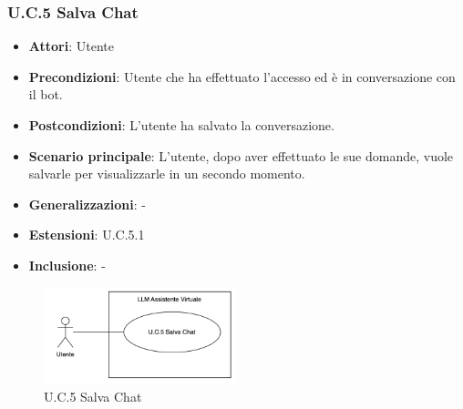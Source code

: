 \subsubsection{U.C.5 Salva Chat}
\begin{itemize}
    \item \textbf{Attori}: Utente
    \item \textbf{Precondizioni}: Utente che ha effettuato l'accesso ed è in conversazione con il bot.
    \item \textbf{Postcondizioni}: L'utente ha salvato la conversazione.
    \item \textbf{Scenario principale}: L'utente, dopo aver effettuato le sue domande, vuole salvarle per visualizzarle in un secondo momento.
    \item \textbf{Generalizzazioni}: -
    \item \textbf{Estensioni}: U.C.5.1
    \item \textbf{Inclusione}: -
\end{itemize}
\begin{figure}[h!]
    \centering
    \includegraphics[width=0.5\textwidth]{img/UC5.png}
    \caption{U.C.5 Salva Chat}
\end{figure}
